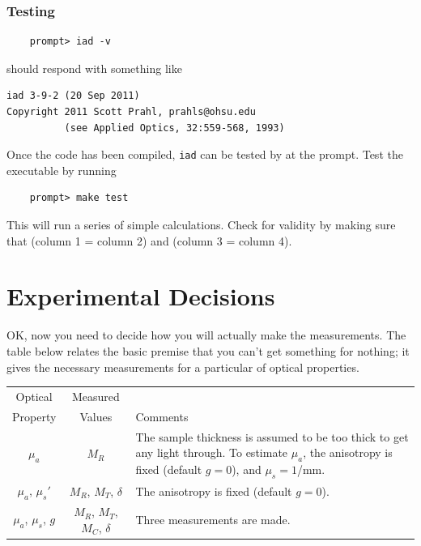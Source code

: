 \documentclass{article}
\newcommand\iadprog{\texttt{iad}}
\begin{document}
\subsubsection{Testing}
\begin{verbatim}
    prompt> iad -v
\end{verbatim}
should respond with something like
\begin{verbatim}
iad 3-9-2 (20 Sep 2011)
Copyright 2011 Scott Prahl, prahls@ohsu.edu
          (see Applied Optics, 32:559-568, 1993)
\end{verbatim}

Once the code has been compiled, \iadprog{} can be tested by
at the prompt.  Test the executable by running
\begin{verbatim}
    prompt> make test
\end{verbatim}
This will run a series of simple calculations.  Check for validity by making sure
that (column 1 = column 2) and (column 3 = column 4).

\clearpage

\section{Experimental Decisions}

OK, now you need to decide how you will actually make the measurements. The table
below relates the basic premise that you can't get something for nothing; it gives
the necessary measurements for a particular of optical properties.

\begin{table}[h!]
\begin{center}
\begin{tabular}{c|c|p{7cm}}
 Optical               & Measured                      & \\
 Property              & Values                        & Comments\\
\hline
 $\mu_a$               & $M_R$                         & The sample thickness is assumed to be too thick to get any light through.  To estimate $\mu_a$, the anisotropy is fixed (default $g=0$), and $\mu_s=1$/mm.\\
 $\mu_a$, $\mu_s'$     & $M_R$, $M_T$, $\delta$        & The anisotropy is fixed (default $g=0$).\\
 $\mu_a$, $\mu_s$, $g$ & $M_R$, $M_T$, $M_C$, $\delta$ & Three measurements are made.\\
\end{tabular}
\end{center}
\end{table}
\end{document}
